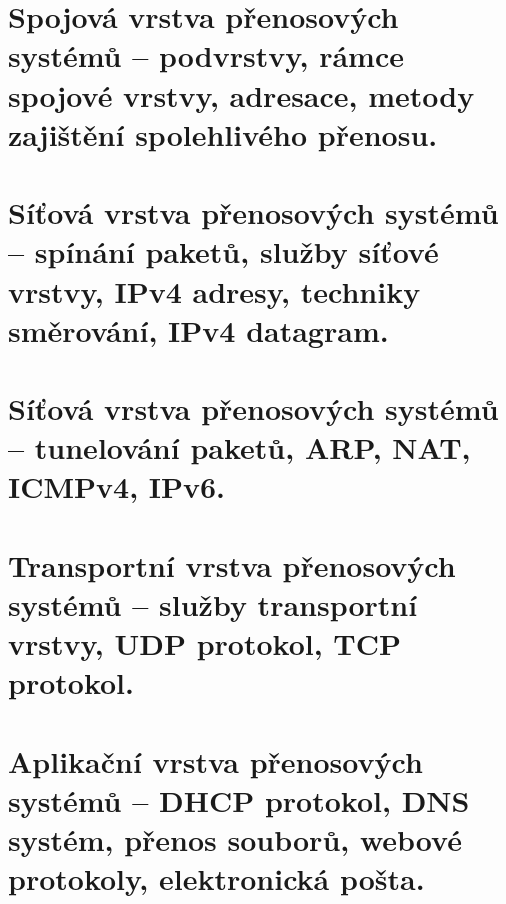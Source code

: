 \clearpage
\section{Spojová vrstva přenosových systémů -- podvrstvy, rámce spojové vrstvy, adresace, metody zajištění spolehlivého přenosu.}

\clearpage
\section{Síťová vrstva přenosových systémů -- spínání paketů, služby síťové vrstvy, IPv4 adresy, techniky směrování, IPv4 datagram.}

\clearpage
\section{Síťová vrstva přenosových systémů -- tunelování paketů, ARP, NAT, ICMPv4, IPv6.}

\clearpage
\section{Transportní vrstva přenosových systémů -- služby transportní vrstvy, UDP protokol, TCP protokol.}

\clearpage
\section{Aplikační vrstva přenosových systémů -- DHCP protokol, DNS systém, přenos souborů, webové protokoly, elektronická pošta.}
